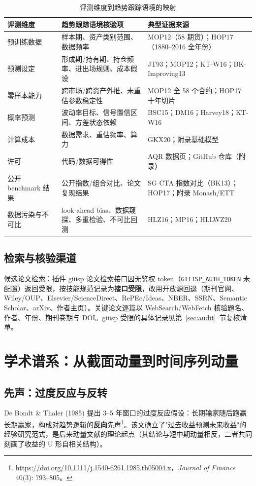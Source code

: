 \documentclass[11pt,a4paper]{article}
\begin{document}
\begin{table}[htbp]
\centering\footnotesize
\caption{评测维度到趋势跟踪语境的映射}\label{tab:mapping}
\begin{tabular}{@{}>{\raggedright\arraybackslash}p{2.4cm}>{\raggedright\arraybackslash}p{6.9cm}>{\raggedright\arraybackslash}p{6.5cm}@{}}
\toprule
\textbf{评测维度} & \textbf{趋势跟踪语境核验项} & \textbf{典型证据来源} \\
\midrule
预训练数据 & 样本期、资产类别范围、数据频率 & MOP12（58 期货）；HOP17（1880--2016 全年份） \\
预测设定 & 形成期/持有期、持仓频率、进出场规则、成本假设 & JT93；MOP12；KT-W16；BK-Improving13 \\
零样本能力 & 跨市场/跨资产外推、未重估参数稳定性 & MOP12 全 58 个合约；HOP17 十年切片 \\
概率预测 & 波动率目标、信号置信区间、方差状态依赖 & BSC15；DM16；Harvey18；KT-W16 \\
计算成本 & 数据需求、重估频率、算力 & GKX20；附录基础模型 \\
许可 & 代码/数据可得性 & AQR 数据页；GitHub 仓库（附录） \\
公开 benchmark 结果 & 公开指数/组合对比、论文复现结果 & SG CTA 指数对比（BK13）；HOP17；附录 Monash/ETT \\
数据污染与不可比 & look-ahead bias、数据窥探、多重检验、不可比回测 & HLZ16；MP16；HLLWZ20 \\
\bottomrule
\end{tabular}
\end{table}

\subsection{检索与核验渠道}
候选论文检索：插件 giiisp 论文检索接口因无鉴权 token（\texttt{GIIISP\_AUTH\_TOKEN} 未配置）返回受限，按技能规范记录为\textbf{接口受限}，改用开放源回退（期刊官网、Wiley/OUP、Elsevier/ScienceDirect、RePEc/Ideas、NBER、SSRN、Semantic Scholar、arXiv、作者主页）。关键论文逐篇以 WebSearch/WebFetch 核验题名、作者、年份、期刊卷期与 DOI。giiisp 受限的具体记录见第~\ref{sec:audit}~节复核清单。

\section{学术谱系：从截面动量到时间序列动量}

\subsection{先声：过度反应与反转}
De Bondt \& Thaler (1985) 提出 3--5 年窗口的过度反应假设：长期输家随后跑赢长期赢家，构成对趋势逻辑的\textbf{反向}先声\footnote{\url{https://doi.org/10.1111/j.1540-6261.1985.tb05004.x}，\emph{Journal of Finance} 40(3): 793--805。}。该文确立了"过去收益预测未来收益"的经验研究范式，是后来动量文献的理论起点（其结论与短中期动量相反，二者共同刻画了收益的 U 形自相关结构）。
\end{document}
